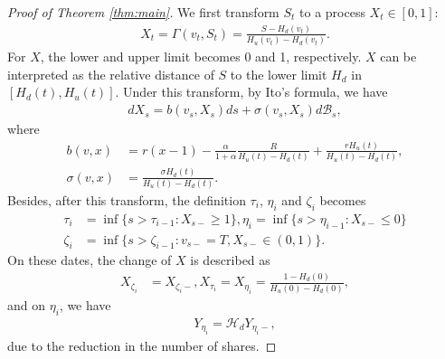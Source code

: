 \documentclass[draft, noinfoline]{ectaart}
\numberwithin{equation}{section}
\theoremstyle{plain}
\begin{document}
\begin{appendices}
\begin{proof}[Proof of Theorem \ref{thm:main}]
	We first transform $S_t$ to a process $X_t\in[0,1]$:
	\begin{align*}
		X_t=\Gamma(v_t,S_t)=\frac{S-H_d(v_t)}{H_u(v_t)-H_d(v_t)}.
	\end{align*}
	For $X$, the lower and upper limit becomes 0 and 1, respectively. $X$ can be interpreted as the relative distance of $S$ to the lower limit $H_d$ in $[H_d(t),H_u(t)]$. Under this transform, by Ito's formula, we have
	\begin{align*}
		dX_s=b(v_s,X_s)ds+\sigma(v_s,X_s)d\mathcal{B}_s,
	\end{align*}
	where
	\begin{align*}
		b(v,x)&=r(x-1)-\frac{\alpha}{1+\alpha}\frac{R}{H_u(t)-H_d(t)}+\frac{rH_u(t)}{H_u(t)-H_d(t)},\\
		\sigma(v,x)&=\frac{\sigma H_d(t)}{H_u(t)-H_d(t)}.
	\end{align*}
	Besides, after this transform, the definition $\tau_i$, $\eta_i$ and $\zeta_i$ becomes
	\begin{align*}
		\tau_i&=\inf\{s>\tau_{i-1}:X_{s-}\ge 1\},\eta_i=\inf\{s>\eta_{i-1}:X_{s-}\le 0\}\\
		\zeta_i&=\inf\{s>\zeta_{i-1}:v_{s-}=T,X_{s-}\in(0,1)\}.
	\end{align*}
	On these dates, the change of $X$ is described as
	\begin{align*}
		X_{\zeta_i}&=X_{\zeta_i-}, X_{\tau_i}=X_{\eta_i}=\frac{1-H_d(0)}{H_u(0)-H_d(0)},
	\end{align*}
	and on $\eta_i$, we have
	\begin{align*}
		Y_{\eta_i}=\mathcal{H}_d Y_{\eta_i-},
	\end{align*}
	due to the reduction in the number of shares.


\end{proof}
\end{appendices}
\end{document}
